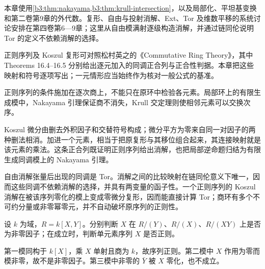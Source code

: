 \ProseParagraphBreak

本章使用\cref{b3:thm:nakayama,b3:thm:krull-intersection}，以及局部化、平坦基变换和第二卷第9章的外代数。复形、自由与投射消解、Ext、Tor 及维数平移的系统讨论安排在第四卷第6—9章；这里从自由模满射逐级构造消解，并通过链同伦说明 Tor 的定义不依赖消解的选择。

\ProseParagraphBreak
正则序列及 Koszul 复形可对照松村英之的《Commutative Ring Theory》\cite[\S16, pp. 123--129]{Matsumura1989CommutativeRingTheory}，其中 Theorems 16.4--16.5 分别给出逐元加入的同调正合列与正合性判据。本章把这些映射和符号逐项写出；一元情形应当始终作为核对一般公式的基准。

%
%







\begin{chaptersummary}
	正则序列的条件施加在逐次商上，不能只在原环中检验各元素。局部环上的有限生成模中，Nakayama 引理保证商不消失，Krull 交定理则使相邻元素可以交换次序。

	\ProseParagraphBreak
	Koszul 微分由删去外积因子和交替符号构成；微分平方为零来自同一对因子的两种删法相消。加进一个元素，相当于把原复形与其移位组合起来，其连接映射就是该元素的乘法。这条正合列既证明正则序列给出消解，也把局部逆命题归结为有限生成同调模上的 Nakayama 引理。

	\ProseParagraphBreak
	自由消解张量后出现的同调是 Tor。消解之间的比较映射在链同伦意义下唯一，因而这些同调不依赖消解的选择，并具有两变量的函子性。一个正则序列的 Koszul 消解在被该序列零化的模上变成零微分复形，因而能直接计算 Tor；商环有多个不可约分量或非零幂零元，并不自动破坏原序列的正则性。
\end{chaptersummary}

\BookExercises

\begin{exercise}\label{b3:ex:15-module-choice}
	设 \(k\) 为域，\(R=k[X,Y]\)。分别判断 \(X\) 在 \(R/(Y)\)、\(R/(X)\)、\(R/(XY)\) 上是否为非零因子；在成立时，判断单元素序列 \(X\) 是否正则。
\end{exercise}
\begin{solution}
	第一模同构于 \(k[X]\)，乘 \(X\) 单射且商为 \(k\)，故序列正则。第二模中 \(X\) 作用为零而模非零，故不是非零因子。第三模中非零的 \(\bar Y\) 被 \(X\) 零化，也不成立。
\end{solution}

